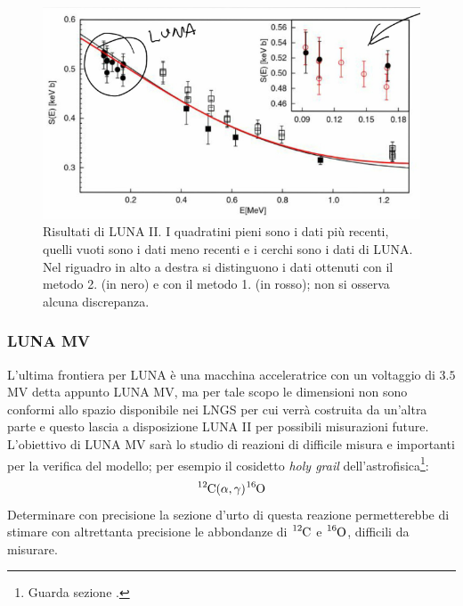 \begin{figure}[!h]
	\centering
	\includegraphics[scale=0.7]{Immagini/0415_SE2.png}
	\caption{Risultati di LUNA II. I quadratini pieni sono i dati più recenti, quelli vuoti sono i dati meno recenti e i cerchi sono i dati di LUNA. Nel riguadro in alto a destra si distinguono i dati ottenuti con il metodo 2. (in nero) e con il metodo 1. (in rosso); non si osserva alcuna discrepanza.}
	\label{0415_lunaii}
\end{figure}

\subsubsection{LUNA MV}
L'ultima frontiera per LUNA è una macchina acceleratrice con un voltaggio di $3.5$ MV detta appunto LUNA MV, ma per tale scopo le dimensioni non sono conformi allo spazio disponibile nei LNGS per cui verrà costruita da un'altra parte e questo lascia a disposizione LUNA II per possibili misurazioni future. L'obiettivo di LUNA MV sarà lo studio di reazioni di difficile misura e importanti per la verifica del modello; per esempio il cosidetto \textit{holy grail} dell'astrofisica\footnote{Guarda sezione .}:
$$\ce{^{12}C(\alpha,\gamma)\ce{^{16}O}}$$
Determinare con precisione la sezione d'urto di questa reazione permetterebbe di stimare con altrettanta precisione le abbondanze di $\ce{^{12}C}$ e $\ce{^{16}O}$, difficili da misurare.

